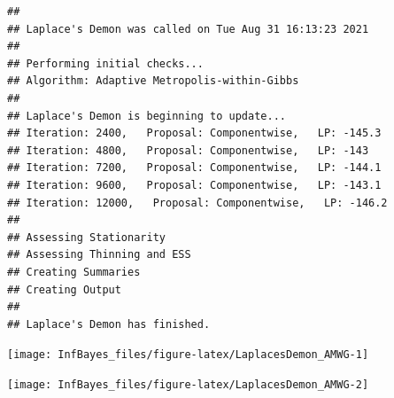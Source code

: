 \documentclass[
]{book}
\newenvironment{Shaded}{\begin{snugshade}}{\end{snugshade}}
\newcommand{\AttributeTok}[1]{\textcolor[rgb]{0.77,0.63,0.00}{#1}}
\newcommand{\CommentTok}[1]{\textcolor[rgb]{0.56,0.35,0.01}{\textit{#1}}}
\newcommand{\ConstantTok}[1]{\textcolor[rgb]{0.00,0.00,0.00}{#1}}
\newcommand{\DecValTok}[1]{\textcolor[rgb]{0.00,0.00,0.81}{#1}}
\newcommand{\FunctionTok}[1]{\textcolor[rgb]{0.00,0.00,0.00}{#1}}
\newcommand{\NormalTok}[1]{#1}
\newcommand{\OtherTok}[1]{\textcolor[rgb]{0.56,0.35,0.01}{#1}}
\newcommand{\SpecialCharTok}[1]{\textcolor[rgb]{0.00,0.00,0.00}{#1}}
\newcommand{\StringTok}[1]{\textcolor[rgb]{0.31,0.60,0.02}{#1}}
\begin{document}
\begin{verbatim}
## 
## Laplace's Demon was called on Tue Aug 31 16:13:23 2021
## 
## Performing initial checks...
## Algorithm: Adaptive Metropolis-within-Gibbs 
## 
## Laplace's Demon is beginning to update...
## Iteration: 2400,   Proposal: Componentwise,   LP: -145.3
## Iteration: 4800,   Proposal: Componentwise,   LP: -143
## Iteration: 7200,   Proposal: Componentwise,   LP: -144.1
## Iteration: 9600,   Proposal: Componentwise,   LP: -143.1
## Iteration: 12000,   Proposal: Componentwise,   LP: -146.2
## 
## Assessing Stationarity
## Assessing Thinning and ESS
## Creating Summaries
## Creating Output
## 
## Laplace's Demon has finished.
\end{verbatim}

\begin{Shaded}
\end{Shaded}

\begin{center}\texttt{[image: InfBayes\_files/figure-latex/LaplacesDemon\_AMWG-1]} \end{center}

\begin{center}\texttt{[image: InfBayes\_files/figure-latex/LaplacesDemon\_AMWG-2]} \end{center}
\end{document}
